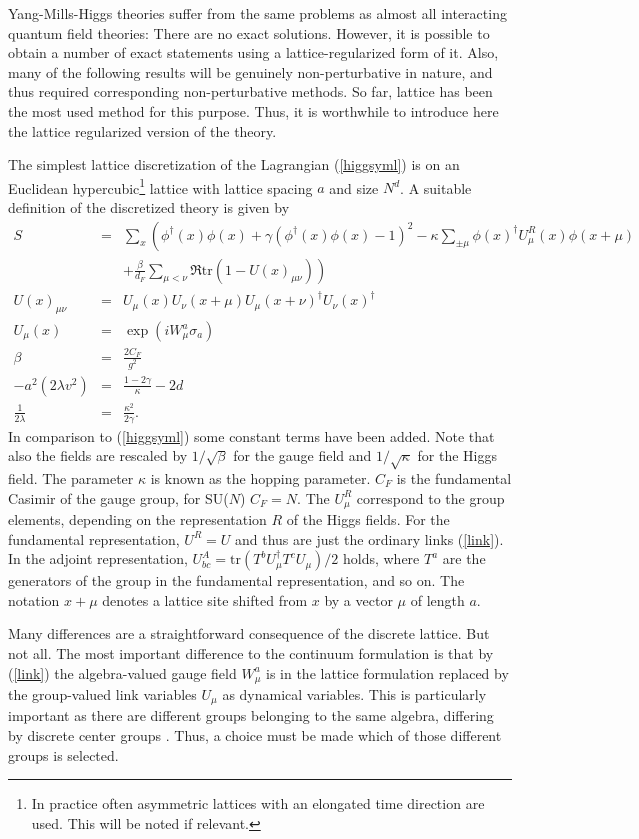 \documentclass[final,12pt,3p,longtitle]{elsarticle}
\newcommand*{\no}{\noindent}
\newcommand*{\bea}{\begin{eqnarray}}
\newcommand*{\eea}{\end{eqnarray}}
\newcommand*{\pref}[1]{(\ref{#1})}
\newcommand*{\mn}{{\mu\nu}}
\newcommand*{\nn}{\nonumber}
\newcommand*{\tr}{\mathrm{tr}}
\newcommand*{\1}{1\!\!\!\bot}
\begin{document}
Yang-Mills-Higgs theories suffer from the same problems as almost all interacting quantum field theories: There are no exact solutions. However, it is possible to obtain a number of exact statements using a lattice-regularized form of it. Also, many of the following results will be genuinely non-perturbative in nature, and thus required corresponding non-perturbative methods. So far, lattice has been the most used method for this purpose. Thus, it is worthwhile to introduce here the lattice regularized version of the theory.

The simplest lattice discretization of the Lagrangian \pref{higgsyml} is on an Euclidean hypercubic\footnote{In practice often asymmetric lattices with an elongated time direction are used. This will be noted if relevant.} lattice with lattice spacing $a$ and size $N^d$. A suitable definition of the discretized theory is given by \cite{Montvay:1994cy}
\bea
S&=&\sum_x\left(\phi^\dagger(x)\phi(x)+\gamma(\phi^\dagger(x)\phi(x)-1)^2-\kappa\sum_{\pm\mu}\phi(x)^\dagger U^R_\mu(x)\phi(x+\mu)\right.\label{higgsymlat}\\
&&\left.+\frac{\beta}{d_F}\sum_{\mu<\nu}\Re\tr\left(1-U(x)_\mn\right)\right)\nn\\
U(x)_\mn&=&U_\mu(x)U_\nu(x+\mu)U_\mu(x+\nu)^\dagger U_\nu(x)^\dagger\label{plaq}\\
U_\mu(x)&=&\exp(iW_\mu^a\sigma_a)\label{link}\\
\beta&=&\frac{2C_F}{g^2}\label{beta}\\
-a^2(2\lambda v^2)&=&\frac{1-2\gamma}{\kappa}-2d\label{hopping}\\
\frac{1}{2\lambda}&=&\frac{\kappa^2}{2\gamma}\label{lambda}.
\eea
\no In comparison to \pref{higgsyml} some constant terms have been added. Note that also the fields are rescaled by $1/\sqrt{\beta}$ for the gauge field and $1/\sqrt{\kappa}$ for the Higgs field. The parameter $\kappa$ is known as the hopping parameter. $C_F$ is the fundamental Casimir of the gauge group, for SU($N$) $C_F=N$.  The $U_\mu^R$ correspond to the group elements, depending on the representation $R$ of the Higgs fields. For the fundamental representation, $U^R=U$ and thus are just the ordinary links \pref{link}. In the adjoint representation, $U^A_{bc}=\tr\left(T^b U_\mu^\dagger T^c U_\mu\right)/2$ holds, where $T^a$ are the generators of the group in the fundamental representation, and so on. The notation $x+\mu$ denotes a lattice site shifted from $x$ by a vector $\mu$ of length $a$.

Many differences are a straightforward consequence of the discrete lattice. But not all. The most important difference to the continuum formulation is that by \pref{link} the algebra-valued gauge field $W_\mu^a$ is in the lattice formulation replaced by the group-valued link variables $U_\mu$ as dynamical variables. This is particularly important as there are different groups belonging to the same algebra, differing by discrete center groups \cite{O'Raifeartaigh:1986vq}. Thus, a choice must be made which of those different groups is selected.
\end{document}

